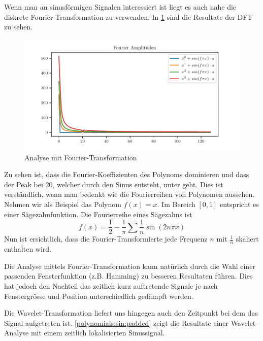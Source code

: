 \begin{refsection}
Wenn man an sinusförmigen Signalen interessiert ist liegt es auch nahe die
diskrete Fourier-Transformation zu verwenden. In \cref{polynomials:sin:fft}
sind die Resultate der DFT zu sehen.

\begin{figure}
    \centering
    \includegraphics{papers/polynomials/images/polynomials_sin_fft.pdf}
    \caption{Analyse mit Fourier-Transformation\label{polynomials:sin:fft}}
\end{figure}

Zu sehen ist, dass die Fourier-Koeffizienten des Polynoms dominieren und dass
der Peak bei 20, welcher durch den Sinus entsteht, unter geht. Dies ist
verständlich, wenn man bedenkt wie die Fourierreihen von Polynomen aussehen.
Nehmen wir als Beispiel das Polynom $f(x) = x$. Im Bereich $[0, 1]$ entspricht
es einer Sägezahnfunktion. Die Fourierreihe eines Sägezahns ist \[f(x) =
\frac{1}{2} - \frac{1}{\pi} \sum{\frac{1}{n} \sin(2 n \pi x)}\] Nun ist
ersichtlich, dass die Fourier-Transformierte jede Frequenz $n$ mit $\frac{1}{n}$
skaliert enthalten wird.

Die Analyse mittels Fourier-Transformation kann natürlich durch die Wahl einer
passenden Fensterfunktion (z.B. Hamming) zu besseren Resultaten führen. Dies
hat jedoch den Nachteil das zeitlich kurz auftretende Signale je nach
Fenstergrösse und Position unterschiedlich gedämpft werden.

Die Wavelet-Transformation liefert uns hingegen auch den Zeitpunkt bei dem das
Signal aufgetreten ist. \cref{polynomials:sin:padded} zeigt die Resultate einer
Wavelet-Analyse mit einem zeitlich lokalisierten Sinussignal.


\end{refsection}
